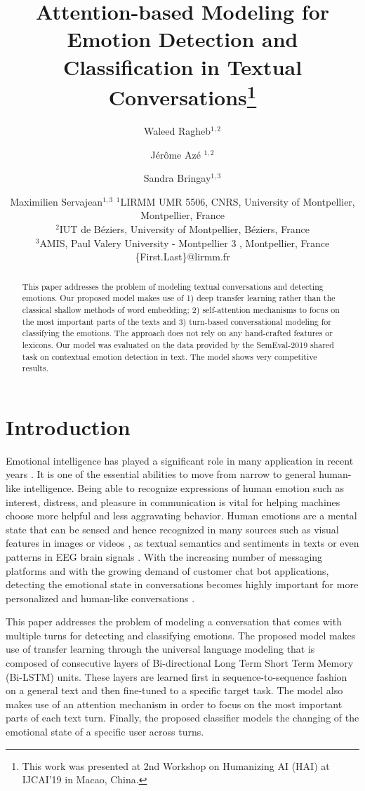 \documentclass{article}
\title{ Attention-based Modeling for Emotion Detection and Classification in Textual Conversations\footnote{This work was presented at 2nd Workshop on Humanizing AI (HAI) at IJCAI'19 in Macao, China.}}
\author{
Waleed Ragheb$^{1,2}$ \and 
 Jérôme Azé $^{1,2}$ \and
Sandra Bringay$^{1,3}$ \and
Maximilien Servajean$^{1,3}$
\affiliations
$^1$LIRMM UMR 5506, CNRS, University of Montpellier, Montpellier, France\\
$^2$IUT de Béziers, University of Montpellier, Béziers, France\\
$^3$AMIS, Paul  Valery University - Montpellier 3 , Montpellier, France
\emails
\{First.Last\}@lirmm.fr
}
\begin{document}
\maketitle

\begin{abstract}
This paper addresses the problem of  modeling textual conversations and  detecting emotions. Our proposed model makes use of 1) deep transfer learning rather than the classical shallow methods of word embedding; 2)  self-attention mechanisms to focus on the most important parts of the texts and 3) turn-based conversational modeling for classifying the emotions. The approach does not rely on any hand-crafted features or lexicons.
Our model was evaluated on the data provided by the SemEval-2019 shared task on contextual emotion detection in text. The model shows very competitive results.

\end{abstract}



\section{Introduction}
Emotional intelligence has played a significant role in many application in recent years \cite{Krakovsky:2018:AI:3200906.3185521}.
It is one of the essential abilities to move from narrow to general human-like intelligence. Being able to recognize expressions of human emotion such as interest, distress, and pleasure in communication is vital for helping machines choose more helpful and less aggravating behavior. Human emotions are a mental state that can be sensed and hence recognized in many sources such as visual features in images or videos \cite{emoimg}, as textual semantics and sentiments in texts \cite{emotext} or even patterns in  EEG brain signals \cite{egg}. With the increasing number of messaging platforms and with the growing demand of customer chat bot applications, detecting the emotional state in conversations becomes highly important for more personalized and human-like conversations \cite{5-chatbot}.

This paper addresses the problem of modeling a conversation that comes with multiple turns for detecting and classifying emotions. The proposed model makes use of transfer learning through the universal language modeling that is composed of consecutive layers of Bi-directional Long Term Short Term Memory (Bi-LSTM) units. These layers are learned first in sequence-to-sequence fashion on a general text and then fine-tuned to a specific target task. The model also makes use of an attention mechanism in order to focus on the most important parts of each text turn. Finally, the proposed classifier models the changing of the emotional state of a specific user across turns.
\end{document}
